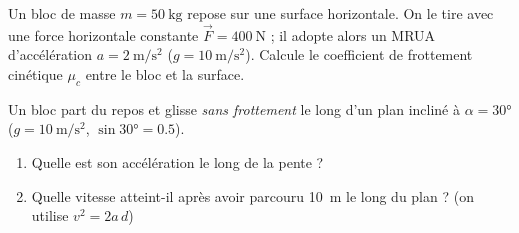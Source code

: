 \documentclass[11pt,a4paper]{article}
\newcommand{\vv}[1]{\vec{#1}}\newcommand{\ds}{\displaystyle}
\begin{document}
\begin{exo}
Un bloc de masse $m=\qty{50}{\kilogram}$ repose sur une surface horizontale. On le tire avec une force
horizontale constante $\vv F=\qty{400}{\newton}$ ; il adopte alors un MRUA d'accélération
$a=\qty{2}{\metre\per\second\squared}$ ($g=\qty{10}{\metre\per\second\squared}$).
Calcule le coefficient de frottement cinétique $\mu_c$ entre le bloc et la surface.
\end{exo}

\begin{exo}
Un bloc part du repos et glisse \emph{sans frottement} le long d'un plan incliné à $\alpha=\ang{30}$
($g=\qty{10}{\metre\per\second\squared}$, $\sin\ang{30}=\num{0,5}$).
\begin{enumerate}[label=\alph*)]
  \item Quelle est son accélération le long de la pente ?
  \item Quelle vitesse atteint-il après avoir parcouru \qty{10}{\metre} le long du plan ? (on utilise $v^2=2a\,d$)
\end{enumerate}
\end{exo}
\end{document}
